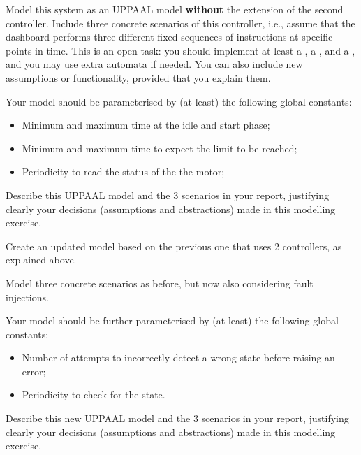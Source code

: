 \documentclass[11pt]{article}
\begin{document}
\begin{myExercise} \label{ex:model}
  Model this system as an UPPAAL model \textbf{without} the extension of the second controller.
  Include three concrete scenarios of this controller, i.e., assume that the dashboard performs three different fixed sequences of instructions at specific points in time.
  This is an open task: you should implement at least a , a , and a , and you may use extra automata if needed. You can also include new assumptions or functionality, provided that you explain them.

  Your model should be parameterised by (at least) the following global constants:
\begin{itemize}
  \item Minimum and maximum time at the idle and start phase;
  \item Minimum and maximum time to expect the limit to be reached;
  \item Periodicity to read the status of the the motor;
\end{itemize}
Describe this UPPAAL model and the 3 scenarios in your report,
justifying clearly your decisions (assumptions and abstractions) made in this modelling exercise.
\end{myExercise}


\begin{myExercise} \label{ex:model2}
  Create an updated model based on the previous one that uses 2 controllers, as explained above.

  Model three concrete scenarios as before, but now also considering fault injections.

  Your model should be further parameterised by (at least) the following global constants:
\begin{itemize}
  \item Number of attempts to incorrectly detect a wrong state before raising an error;
  \item Periodicity to check for the state.
\end{itemize}
Describe this new UPPAAL model and the 3 scenarios in your report,
justifying clearly your decisions (assumptions and abstractions) made in this modelling exercise.
\end{myExercise}
\end{document}

